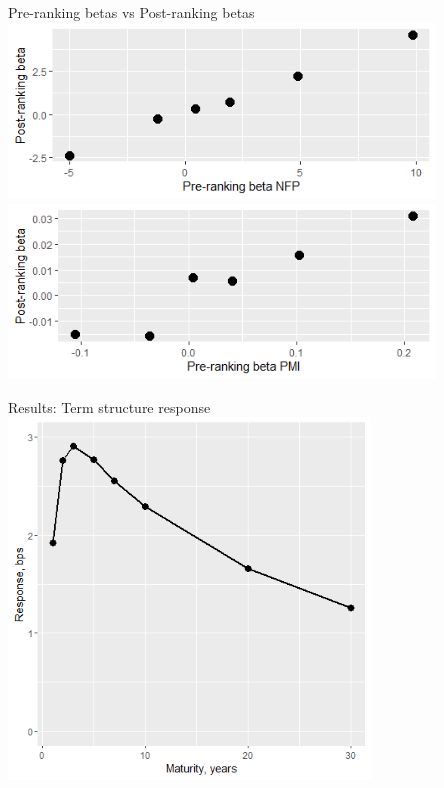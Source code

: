 \documentclass{beamer}
\begin{document}
\begin{frame}{Pre-ranking betas vs Post-ranking betas}
\centering
\includegraphics[width=0.85\textwidth]{old_files/i102_f1a.png}
\includegraphics[width=0.85\textwidth]{old_files/i102_f1b.png}  
\end{frame}




\begin{frame}{Results: Term structure response}
\centering
\includegraphics[width=0.72\textwidth]{old_files/F2_termstructure_0.png}
\end{frame}
\end{document}
